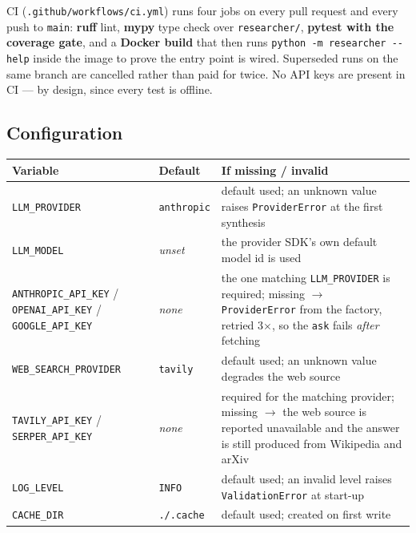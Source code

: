 \documentclass[11pt,a4paper]{article}
\begin{document}
CI (\texttt{.github/workflows/ci.yml}) runs four jobs on every pull request and every push to
\texttt{main}: \textbf{ruff} lint, \textbf{mypy} type check over \texttt{researcher/},
\textbf{pytest with the coverage gate}, and a \textbf{Docker build} that then runs
\texttt{python -m researcher -{}-help} inside the image to prove the entry point is wired.
Superseded runs on the same branch are cancelled rather than paid for twice. No API keys are present
in CI --- by design, since every test is offline.

\subsection{Configuration}

\begin{center}\small
\begin{tabularx}{\textwidth}{@{}>{\RaggedRight\arraybackslash}p{5.1cm}
                              >{\RaggedRight\arraybackslash}p{2.3cm} X@{}}
\toprule
\textbf{Variable} & \textbf{Default} & \textbf{If missing / invalid} \\
\midrule
\texttt{LLM\_PROVIDER} & \texttt{anthropic} & default used; an unknown value raises
\texttt{ProviderError} at the first synthesis \\
\addlinespace
\texttt{LLM\_MODEL} & \emph{unset} & the provider SDK's own default model id is used \\
\addlinespace
\texttt{ANTHROPIC\_API\_KEY} /\newline
\texttt{OPENAI\_API\_KEY} /\newline
\texttt{GOOGLE\_API\_KEY} &
\emph{none} & the one matching \texttt{LLM\_PROVIDER} is required; missing
$\to$ \texttt{ProviderError} from the factory, retried 3$\times$, so the \texttt{ask}
fails \emph{after} fetching \\
\addlinespace
\texttt{WEB\_SEARCH\_PROVIDER} & \texttt{tavily} & default used; an unknown value degrades
the web source \\
\addlinespace
\texttt{TAVILY\_API\_KEY} /\newline
\texttt{SERPER\_API\_KEY} & \emph{none} &
required for the matching provider; missing $\to$ the web source is reported unavailable
and the answer is still produced from Wikipedia and arXiv \\
\addlinespace
\texttt{LOG\_LEVEL} & \texttt{INFO} & default used; an invalid level raises
\texttt{ValidationError} at start-up \\
\texttt{CACHE\_DIR} & \texttt{./.cache} & default used; created on first write \\

\end{tabularx}
\end{center}
\end{document}
